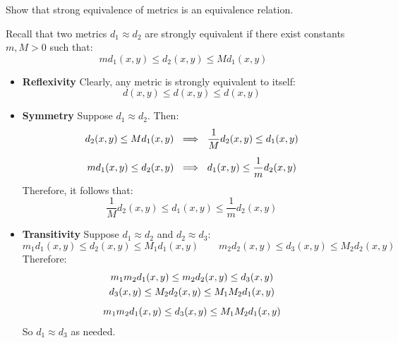 \documentclass{article}
\begin{document}
\setcounter{subsection}{6}
\setcounter{exr}{256}

\begin{exr}
    Show that strong equivalence of metrics is an equivalence relation.
\end{exr}

\begin{pf}
    Recall that two metrics $ d_{1} \approx d_{2} $ are strongly equivalent if there exist
    constants $ m, M > 0 $ such that:
    \begin{equation*}
        md_{1}(x, y) \leq d_{2}(x, y) \leq Md_{1}(x, y)
    \end{equation*}
    \begin{itemize}
        \item \textbf{Reflexivity} \vsp
            Clearly, any metric is strongly equivalent to itself:
            \begin{equation*}
                d(x, y) \leq d(x, y) \leq d(x, y)
            \end{equation*}
        \item \textbf{Symmetry} \vsp
            Suppose $ d_{1} \approx d_{2} $. Then:
            \begin{gather*}
                d_{2}(x, y) \leq Md_{1}(x, y) \ \implies \ \frac{1}{M}d_{2}(x, y) \leq d_{1}(x, y)
                \vsp
                md_{1}(x, y) \leq d_{2}(x, y) \ \implies \ d_{1}(x, y) \leq \frac{1}{m}d_{2}(x, y)
            \end{gather*}
            Therefore, it follows that:
            \begin{equation*}
                \frac{1}{M}d_{2}(x, y) \leq d_{1}(x, y) \leq \frac{1}{m}d_{2}(x, y)
            \end{equation*}
        \item \textbf{Transitivity} \vsp
            Suppose $ d_{1} \approx d_{2} $ and $ d_{2} \approx d_{3} $:
            \begin{equation*}
                m_{1}d_{1}(x, y) \leq d_{2}(x, y) \leq M_{1}d_{1}(x, y) \qquad
                m_{2}d_{2}(x, y) \leq d_{3}(x, y) \leq M_{2}d_{2}(x, y)
            \end{equation*}
            Therefore:
            \begin{gather*}
                m_{1}m_{2}d_{1}(x, y) \leq m_{2}d_{2}(x, y) \leq d_{3}(x, y) \\
                d_{3}(x, y) \leq M_{2}d_{2}(x, y) \leq M_{1}M_{2}d_{1}(x, y) \vsp
                m_{1}m_{2}d_{1}(x, y) \leq d_{3}(x, y) \leq M_{1}M_{2}d_{1}(x, y)
            \end{gather*}
            So $ d_{1} \approx d_{3} $ as needed.
    \end{itemize}
\end{pf}
\end{document}
